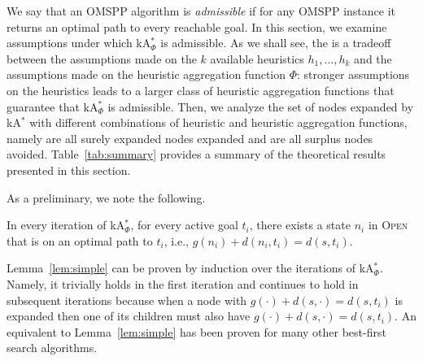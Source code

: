 \documentclass[smallextended]{svjour3}       %
\newcommand{\omspp}{\ac{OMSPP}\xspace}
\newcommand{\kastar}{kA$^*$\xspace}
\newcommand{\kastarvar}[1]{\textup{kA}$^*_{#1}$\xspace}
\newcommand{\kastarmin}{\kastarvar{\min}}
\newcommand{\kastarphi}{\textup{kA}$^*_{\Phi}$\xspace}
\newcommand{\open}{\textsc{Open}\xspace}
\newcommand{\abda}[1]{\textbf{[AS:#1]}}
\begin{document}

We say that an \omspp algorithm is \emph{admissible} if for any \omspp instance it returns an optimal path to every reachable goal. 
In this section, we examine assumptions under which \kastarphi is admissible. 
As we shall see, the is a tradeoff between the assumptions made on the $k$ available heuristics $h_1,\ldots,h_k$ and the assumptions made on the heuristic aggregation function $\Phi$: stronger assumptions on the heuristics leads to a
larger class of heuristic aggregation functions that guarantee that \kastarphi is admissible. 
Then, we analyze the set of nodes expanded by \kastar with different combinations of heuristic and heuristic aggregation functions, namely are all surely expanded nodes expanded and are all surplus nodes avoided.  
Table~\ref{tab:summary} provides a summary of the theoretical results presented in this section. 


As a preliminary, we note the following. 
\begin{lemma}
  \label{lem:simple}
  In every iteration of \kastarphi, for every active goal $t_i$, there exists a state $n_i$ in \open that is on an optimal path to $t_i$, i.e., $g(n_i) + d(n_i, t_i) = d(s, t_i)$.
\end{lemma}

Lemma~\ref{lem:simple} can be proven by induction over the iterations of \kastarphi. 
Namely, it trivially holds in the first iteration and continues to hold in subsequent iterations because when a node with $g(\cdot) + d(s,\cdot) = d(s, t_i)$ is expanded then one of its children must also have $g(\cdot) + d(s,\cdot) = d(s, t_i)$.
An equivalent to Lemma~\ref{lem:simple} has been proven for many other best-first search algorithms.

\end{document}
